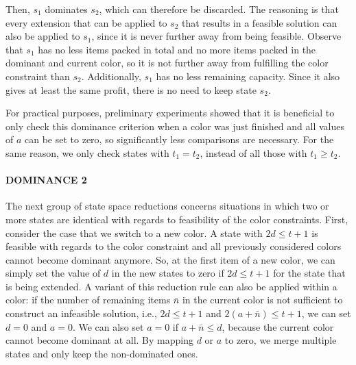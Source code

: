 \documentclass[preprint,11pt]{elsarticle}
\theoremstyle{definition}
\begin{document}
Then, $s_1$ dominates $s_2$, which can therefore be discarded.  
The reasoning is that every extension that can be applied to $s_2$ that results in a feasible solution can also be applied to $s_1$, since it is never further away from being feasible.
Observe that $s_1$ has no less items packed in total and no more items packed in the dominant and current color, so it is not further away from fulfilling the color constraint than $s_2$.
Additionally, $s_1$ has no less remaining capacity.
Since it also gives at least the same profit, there is no need to keep state $s_2$.

For practical purposes, preliminary experiments showed that it is beneficial to only check this dominance criterion when a color was just finished and all values of $a$ can be set to zero, so significantly less comparisons are necessary. For the same reason, we only check states with $t_1=t_2$, instead of all those with $t_1\geq t_2$.

\paragraph{DOMINANCE 2} 
The next group of state space reductions concerns situations in which two or more states are identical with regards to feasibility of the color constraints.
First, consider the case that we switch to a new color.
A state with $2d \leq t + 1$ is feasible with regards to the color constraint and all previously considered colors cannot become dominant anymore. 
So, at the first item of a new color, we can simply set the value of $d$ in the new states to zero if $2d \leq t+1$ for the state that is being extended.
A variant of this reduction rule can also be applied within a color: if the number of remaining items $\bar{n}$ in the current color is not sufficient to construct an infeasible solution, i.e., $2d \leq t+1$ and $2(a + \bar{n}) \leq t + 1 $, we can set $d = 0$ and $a = 0$. 
We can also set $a=0$ if $a + \bar{n} \leq d$, because the current color cannot become dominant at all. 
By mapping $d$ or $a$ to zero, we merge multiple states and only keep the non-dominated ones.
\end{document}
